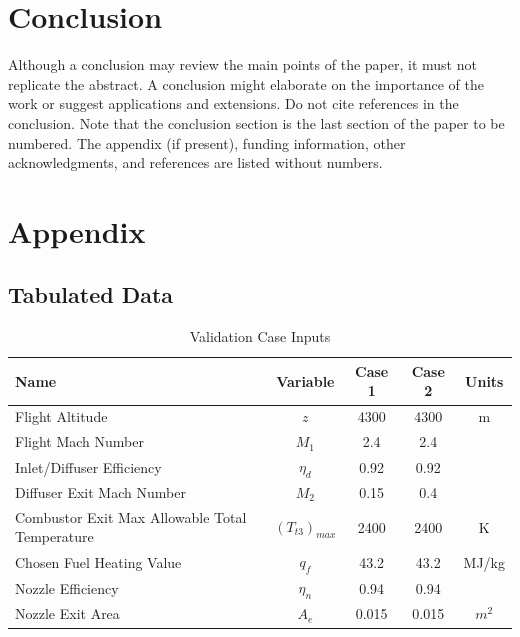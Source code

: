 \documentclass[conf]{new-aiaa} %
\begin{document}
\section{Conclusion}
Although a conclusion may review the main points of the paper, it must not replicate the abstract. A conclusion might elaborate on the importance of the work or suggest applications and extensions. Do not cite references in the conclusion. Note that the conclusion section is the last section of the paper to be numbered. The appendix (if present), funding information, other acknowledgments, and references are listed without numbers.


\section*{Appendix}
\subsection{Tabulated Data}
\begin{table}[hbt!] %
    \caption{\label{tab:val_case_input} Validation Case Inputs}
    \centering
    \begin{tabular}{lcccc}
        \hline
        Name& Variable& Case 1& Case 2& Units\\\hline
        Flight Altitude& $z$& 4300& 4300& m\\
        Flight Mach Number& $M_1$& 2.4& 2.4\\
        Inlet/Diffuser Efficiency& $\eta_d$& 0.92& 0.92\\
        Diffuser Exit Mach Number& $M_2$& 0.15& 0.4\\
        Combustor Exit Max Allowable Total Temperature& $(T_{t3})_{max}$& 2400& 2400& K\\
        Chosen Fuel Heating Value& $q_f$& 43.2& 43.2& MJ/kg\\
        Nozzle Efficiency& $\eta_n$& 0.94& 0.94\\
        Nozzle Exit Area& $A_e$& 0.015& 0.015& $m^2$\\
        \hline
    \end{tabular}
\end{table}
\end{document}
